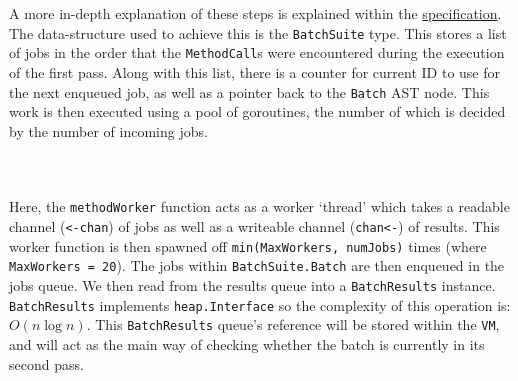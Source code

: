 A more in-depth explanation of these steps is explained within the \hyperref[sec:batching]{specification}. The data-structure used to achieve this is the \verb|BatchSuite| type. This stores a list of jobs in the order that the \verb|MethodCall|s were encountered during the execution of the first pass. Along with this list, there is a counter for current ID to use for the next enqueued job, as well as a pointer back to the \verb|Batch| AST node. This work is then executed using a pool of goroutines, the number of which is decided by the number of incoming jobs.

\inputminted[firstline=72, lastline=78, autogobble, breaklines, tabsize=4]{go}{../../src/batch.go}

\inputminted[firstline=89, lastline=102, autogobble, breaklines, tabsize=4]{go}{../../src/batch.go}

\inputminted[firstline=124, lastline=160, autogobble, breaklines, tabsize=4]{go}{../../src/batch.go}

Here, the \verb|methodWorker| function acts as a worker `thread' which takes a readable channel (\texttt{<-chan}) of jobs as well as a writeable channel (\texttt{chan<-}) of results. This worker function is then spawned off \verb|min(MaxWorkers, numJobs)| times (where \verb|MaxWorkers = 20|). The jobs within \verb|BatchSuite.Batch| are then enqueued in the jobs queue. We then read from the results queue into a \verb|BatchResults| instance. \verb|BatchResults| implements \verb|heap.Interface| so the complexity of this operation is: $O(n \log n)$. This \verb|BatchResults| queue's reference will be stored within the \verb|VM|, and will act as the main way of checking whether the batch is currently in its second pass.

